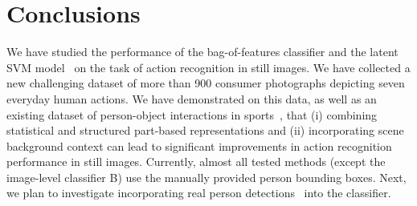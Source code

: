 \documentclass{bmvc2k}
\newcommand{\secnspc}{\vspace*{-2mm}}
\begin{document}
\secnspc
\section{Conclusions}
\secnspc

We have studied the performance of the bag-of-features classifier and the latent SVM
model~\cite{Felzenszwalb09} on the task of action recognition in still images.
We have collected a new challenging dataset of more than 900 consumer photographs depicting seven everyday human actions.
We have demonstrated on this data, as well as an existing dataset of person-object interactions in sports~\cite{Gupta09},  that  (i) combining statistical and structured part-based representations and (ii) incorporating scene background context can lead to significant improvements in action recognition performance in still images. 
Currently, almost all tested methods (except the image-level classifier B) use the manually provided person bounding boxes. 
Next, we plan to investigate incorporating real person detections~\cite{Dalal05,Felzenszwalb09} into the classifier.





%

 

%



\end{document}
